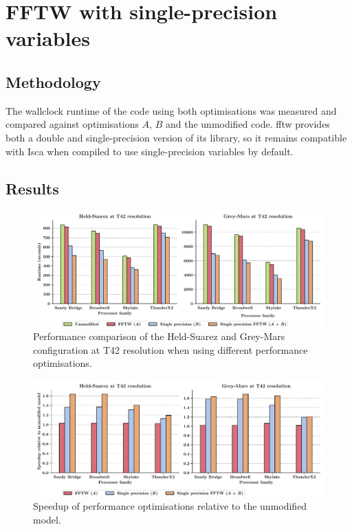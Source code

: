 \documentclass[a4paper,11pt]{report}
\begin{document}
\section{FFTW with single-precision variables}

\subsection{Methodology}
The wallclock runtime of the code using both optimisations was measured and compared against optimisations $A$, $B$ and the unmodified code. \gls{fftw} provides both a double and single-precision version of its library, so it remains compatible with Isca when compiled to use single-precision variables by default.
\subsection{Results}
\begin{figure}[H]
\begin{center}
\includegraphics[width=\textwidth]{img/opt_comparison.pdf}
\caption[Runtimes of all optimisations]{Performance comparison of the Held-Suarez and Grey-Mars configuration at T42 resolution when using different performance optimisations.}
\label{fig:opt-comparison}
\end{center}
\end{figure}

\begin{figure}[H]
\begin{center}
\includegraphics[width=\textwidth]{img/speedup-opt.pdf}
\caption{Speedup of performance optimisations relative to the unmodified model.}
\label{fig:opt-comparison}
\end{center}
\end{figure}
\end{document}
